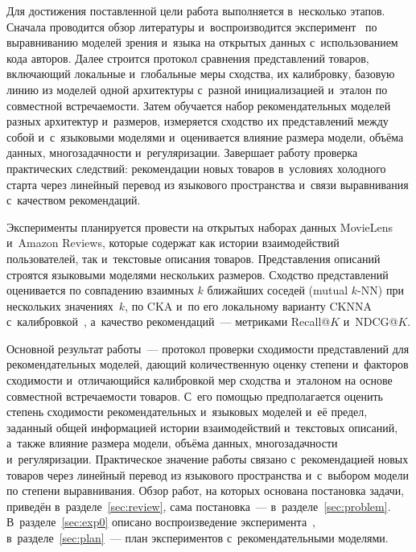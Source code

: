 \documentclass[a4paper,12pt]{article}
\begin{document}
Для достижения поставленной цели работа выполняется в~несколько этапов. Сначала
проводится обзор литературы и~воспроизводится эксперимент~\cite{huh2024platonic}
по выравниванию моделей зрения и~языка на открытых данных с~использованием кода
авторов. Далее строится протокол сравнения представлений товаров, включающий локальные
и~глобальные меры сходства, их калибровку, базовую линию из моделей одной архитектуры
с~разной инициализацией и~эталон по совместной встречаемости. Затем обучается набор
рекомендательных моделей разных архитектур и~размеров, измеряется сходство
их представлений между собой и~с~языковыми моделями и~оценивается влияние размера
модели, объёма данных, многозадачности и~регуляризации. Завершает работу проверка
практических следствий: рекомендации новых товаров в~условиях холодного старта через
линейный перевод из языкового пространства и~связи выравнивания с~качеством
рекомендаций.

Эксперименты планируется провести на открытых наборах данных MovieLens и~Amazon
Reviews, которые содержат как истории взаимодействий пользователей, так и~текстовые
описания товаров. Представления описаний строятся языковыми моделями нескольких
размеров. Сходство представлений оценивается по совпадению взаимных $k$ ближайших
соседей (mutual $k$-NN) при нескольких значениях~$k$, по CKA и~по его локальному
варианту CKNNA~\cite{huh2024platonic} с~калибровкой~\cite{groger2026aristotelian},
а~качество рекомендаций~--- метриками Recall@$K$ и~NDCG@$K$.

Основной результат работы~--- протокол проверки сходимости представлений для
рекомендательных моделей, дающий количественную оценку степени и~факторов сходимости
и~отличающийся калибровкой мер сходства и~эталоном на основе совместной встречаемости
товаров. С~его помощью предполагается оценить степень сходимости рекомендательных
и~языковых моделей и~её предел, заданный общей информацией истории взаимодействий
и~текстовых описаний, а~также влияние размера модели, объёма данных, многозадачности
и~регуляризации. Практическое значение работы связано с~рекомендацией новых товаров
через линейный перевод из языкового пространства и~с~выбором модели по степени
выравнивания. Обзор работ, на которых основана постановка задачи, приведён
в~разделе~\ref{sec:review}, сама постановка~--- в~разделе~\ref{sec:problem}.
В~разделе~\ref{sec:exp0} описано воспроизведение эксперимента~\cite{huh2024platonic},
в~разделе~\ref{sec:plan}~--- план экспериментов с~рекомендательными моделями.

\end{document}

